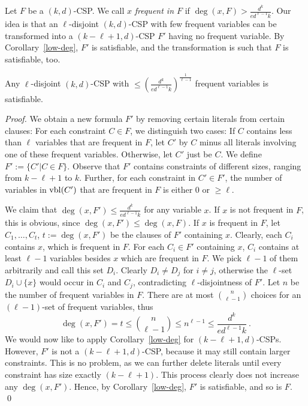 \documentclass[envcountsect, envcountsame]{llncs}
\newcommand{\vbl}{\ensuremath{{\rm vbl}}}
\begin{document}
Let $F$ be a $(k,d)$-CSP. We call $x$ {\em frequent in $F$} if
$\deg(x,F) > \frac{d^k}{ed^{\ell -1}k}$. Our idea is that an
$\ell$-disjoint $(k,d)$-CSP with few frequent variables can be
transformed into a $(k-\ell+1,d)$-CSP $F'$ having no frequent
variable. By Corollary~\ref{low-deg}, $F'$ is satisfiable, and the
transformation is such that $F$ is satisfiable, too.

\begin{theorem}
  Any $\ell$-disjoint $(k,d)$-CSP with $\leq \left(\frac{d^k}{ed^{\ell
        -1}k}\right)^{\frac{1}{\ell -1}}$ frequent variables is
  satisfiable.
\label{few-frequent}
\end{theorem}

\begin{proof}
  We obtain a new formula $F'$ by removing certain literals from
  certain clauses: For each constraint $C \in F$, we distinguish two
  cases: If $C$ contains less than $\ell$ variables that are frequent
  in $F$, let $C'$ by $C$ minus all literals involving one of these
  frequent variables. Otherwise, let $C'$ just be $C$.  We define $F'
  := \{C' \big| C \in F\}$. Observe that $F'$ contains constraints of
  different sizes, ranging from $k-\ell+1$ to $k$. Further, for
  each constraint in $C' \in F'$, the number of variables in 
  $\vbl(C')$ that are frequent in $F$ is either $0$ or $\geq \ell$.
  
  We claim that $\deg(x,F') \leq \frac{d^k}{ed^{\ell -1}k}$ for any
  variable $x$. If $x$ is not frequent in $F$, this is obvious, since
  $\deg(x,F')\leq \deg(x,F)$.  If $x$ is frequent in $F$, let $C_1,
  \dots, C_t$, $t:=\deg(x,F')$ be the clauses of $F'$ containing $x$.
  Clearly, each $C_i$ contains $x$, which is frequent in $F$.  For
  each $C_i \in F'$ containing $x$, $C_i$ contains at least $\ell -1$
  variables besides $x$ which are frequent in $F$. We pick $\ell-1$ of
  them arbitrarily and call this set $D_i$.  Clearly $D_i \ne D_j$ for
  $i \ne j$, otherwise the $\ell$-set $D_i \cup \{x\}$ would occur in
  $C_i$ and $C_j$, contradicting $\ell$-disjointness of $F'$.  Let $n$
  be the number of frequent variables in $F$. There are at most ${n
    \choose \ell -1}$ choices for an $(\ell-1)$-set of frequent
  variables, thus
  $$
  \deg(x,F') = t \leq {n \choose \ell -1} \leq n^{\ell -1} 
  \leq \frac{d^k}{ed^{\ell-1}k} \ .
  $$  
  We would now like to apply Corollary~\ref{low-deg} for
  $(k-\ell+1,d)$-CSPs.  However, $F'$ is not a $(k-\ell+1,d)$-CSP,
  because it may still contain larger constraints. This is no problem,
  as we can further delete literals until every constraint has size
  exactly $(k-\ell+1)$.  This process clearly does not increase any
  $\deg(x,F')$. Hence, by Corollary~\ref{low-deg}, $F'$ is
  satisfiable, and so is $F$.  \qed
\end{proof}
\end{document}
